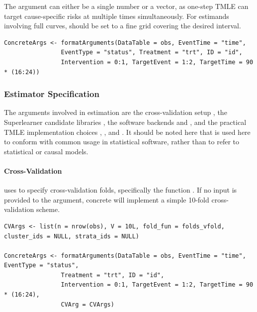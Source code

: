 \documentclass{report}
\newcommand{\1}{\ensuremath{\mathbf{1}}}
\begin{document}
The  argument can either be a single number or a vector, as one-step TMLE can target cause-specific risks at multiple times simultaneously. For estimands involving full curves,  should be set to a fine grid covering the desired interval.

\begin{lstlisting}
ConcreteArgs <- formatArguments(DataTable = obs, EventTime = "time",
				EventType = "status", Treatment = "trt", ID = "id", 
				Intervention = 0:1, TargetEvent = 1:2, TargetTime = 90 * (16:24))
\end{lstlisting}


\subsubsection{Estimator Specification}
\label{EstimationSpec}
The  arguments involved in estimation are the cross-validation setup , the Superlearner candidate libraries , the software backends  and , and the practical TMLE implementation choices , , and . It should be noted here that  is used here to conform with common usage in statistical software, rather than to refer to statistical or causal models. 

\paragraph{Cross-Validation}
\label{CV}
 uses  to specify cross-validation folds, specifically the function
. If no input is provided to the  argument, concrete will implement a simple 10-fold cross-validation scheme.

\begin{lstlisting}
CVArgs <- list(n = nrow(obs), V = 10L, fold_fun = folds_vfold, cluster_ids = NULL, strata_ids = NULL)

ConcreteArgs <- formatArguments(DataTable = obs, EventTime = "time", EventType = "status", 
				Treatment = "trt", ID = "id", 
				Intervention = 0:1, TargetEvent = 1:2, TargetTime = 90 * (16:24), 
				CVArg = CVArgs)
\end{lstlisting}
\end{document}
